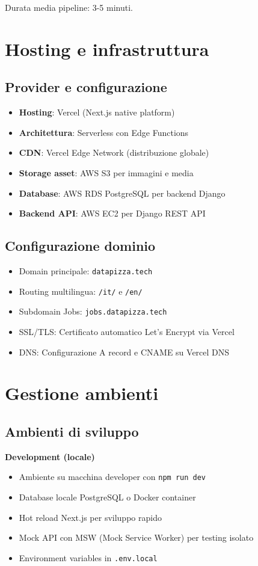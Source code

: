 Durata media pipeline: 3-5 minuti.

\section{Hosting e infrastruttura}
\subsection{Provider e configurazione}
\begin{itemize}
  \item \textbf{Hosting}: Vercel (Next.js native platform)
  \item \textbf{Architettura}: Serverless con Edge Functions
  \item \textbf{CDN}: Vercel Edge Network (distribuzione globale)
  \item \textbf{Storage asset}: AWS S3 per immagini e media
  \item \textbf{Database}: AWS RDS PostgreSQL per backend Django
  \item \textbf{Backend API}: AWS EC2 per Django REST API
\end{itemize}

\subsection{Configurazione dominio}
\begin{itemize}
  \item Domain principale: \texttt{datapizza.tech}
  \item Routing multilingua: \texttt{/it/} e \texttt{/en/}
  \item Subdomain Jobs: \texttt{jobs.datapizza.tech}
  \item SSL/TLS: Certificato automatico Let's Encrypt via Vercel
  \item DNS: Configurazione A record e CNAME su Vercel DNS
\end{itemize}

\section{Gestione ambienti}
\subsection{Ambienti di sviluppo}
\textbf{Development (locale)}
\begin{itemize}
  \item Ambiente su macchina developer con \texttt{npm run dev}
  \item Database locale PostgreSQL o Docker container
  \item Hot reload Next.js per sviluppo rapido
  \item Mock API con MSW (Mock Service Worker) per testing isolato
  \item Environment variables in \texttt{.env.local}
\end{itemize}

